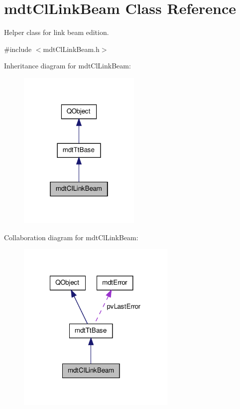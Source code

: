 \hypertarget{classmdt_cl_link_beam}{\section{mdt\-Cl\-Link\-Beam Class Reference}
\label{classmdt_cl_link_beam}
}


Helper class for link beam edition.  




{\ttfamily \#include $<$mdt\-Cl\-Link\-Beam.\-h$>$}



Inheritance diagram for mdt\-Cl\-Link\-Beam\-:\nopagebreak
\begin{figure}[H]
\begin{center}
\leavevmode
\includegraphics[width=166pt]{classmdt_cl_link_beam__inherit__graph}
\end{center}
\end{figure}


Collaboration diagram for mdt\-Cl\-Link\-Beam\-:\nopagebreak
\begin{figure}[H]
\begin{center}
\leavevmode
\includegraphics[width=216pt]{classmdt_cl_link_beam__coll__graph}
\end{center}
\end{figure}
